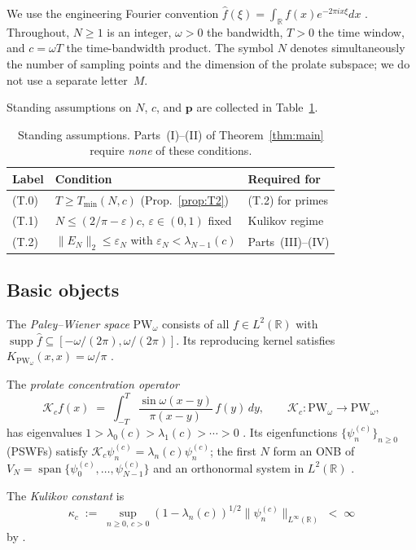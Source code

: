 \documentclass[12pt,a4paper]{amsart}
\theoremstyle{definition}
\newcommand{\PW}{\mathrm{PW}_\omega}
\newcommand{\Kop}{\mathcal{K}_c}
\newcommand{\Kul}{\kappa_c}
\newcommand{\psin}{\psi_n^{(c)}}
\newcommand{\lam}{\lambda_n(c)}
\newcommand{\Tmin}{T_{\min}}
\newcommand{\EN}{E_N}
\newcommand{\norm}[1]{\|#1\|}
\begin{document}
We use the engineering Fourier convention
$\widehat{f}(\xi)=\int_{\mathbb{R}}f(x)e^{-2\pi ix\xi}dx$
\cite{BonamiKaroui}.
Throughout, $N\geq1$ is an integer, $\omega>0$ the bandwidth,
$T>0$ the time window, and $c=\omega T$ the time-bandwidth product.
The symbol $N$ denotes simultaneously the number of sampling points
and the dimension of the prolate subspace; we do not use a
separate letter~$M$.

Standing assumptions on $N$, $c$, and $\mathbf{p}$
are collected in Table~\ref{tab:assumptions}.

\begin{table}[h]
\centering
\begin{tabular}{@{}lll@{}}
\toprule
Label & Condition & Required for \\
\midrule
(T.0) & $T\geq\Tmin(N,c)$ (Prop.~\ref{prop:T2}) & (T.2) for primes \\
(T.1) & $N\leq(2/\pi-\varepsilon)c$, $\varepsilon\in(0,1)$ fixed & Kulikov regime \\
(T.2) & $\norm{\EN}_2\leq\varepsilon_N$ with $\varepsilon_N<\lambda_{N-1}(c)$
        & Parts~(III)--(IV) \\
\bottomrule
\end{tabular}
\caption{Standing assumptions. Parts~(I)--(II) of Theorem~\ref{thm:main}
require \emph{none} of these conditions.}\label{tab:assumptions}
\end{table}

\subsection{Basic objects}

The \emph{Paley--Wiener space} $\PW$ consists of all
$f\in L^2(\mathbb{R})$ with $\operatorname{supp}\widehat{f}\subseteq
[-\omega/(2\pi),\omega/(2\pi)]$.
Its reproducing kernel satisfies $K_{\PW}(x,x)=\omega/\pi$
\cite[Eq.~(3)]{BonamiKaroui}.

The \emph{prolate concentration operator}
\[
  \Kop f(x)\;=\;
  \int_{-T}^{T}\frac{\sin\omega(x-y)}{\pi(x-y)}\,f(y)\,dy,
  \qquad \Kop:\PW\to\PW,
\]
has eigenvalues $1>\lambda_0(c)>\lambda_1(c)>\cdots>0$ \cite{Slepian1978}.
Its eigenfunctions $\{\psin\}_{n\geq0}$ (PSWFs) satisfy
$\Kop\psin=\lambda_n(c)\psin$; the first $N$ form an ONB of
$V_N=\operatorname{span}\{\psi_0^{(c)},\ldots,\psi_{N-1}^{(c)}\}$
and an orthonormal system in $L^2(\mathbb{R})$ \cite[Thm.~S]{BonamiKaroui}.

The \emph{Kulikov constant} is
\[
  \Kul\;:=\;
  \sup_{n\geq0,\,c>0}
  (1-\lam)^{1/2}\norm{\psin}_{L^\infty(\mathbb{R})}
  \;<\;\infty
\]
by \cite[Thm.~1.1]{Kulikov2023}.
\end{document}
